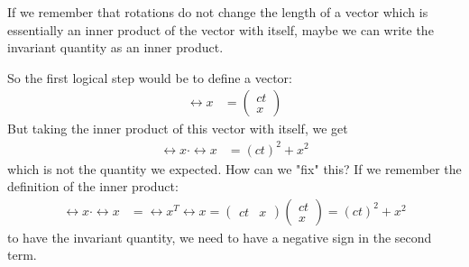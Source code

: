 If we remember that rotations do not change the length of a vector which is essentially an inner product of the vector with itself,
maybe we can write the invariant quantity as an inner product.

So the first logical step would be to define a vector:
\begin{align}
  \rel{x} & = \begin{pmatrix}
                ct \\
                x
              \end{pmatrix}
\end{align}
But taking the inner product of this vector with itself, we get
\begin{align}
  \rel{x} \cdot \rel{x} & = (ct)^2 + x^2
\end{align}
which is not the quantity we expected.
How can we "fix" this?
If we remember the definition of the inner product:
\begin{align}
  \rel{x} \cdot \rel{x} & = \rel{x}^T \rel{x} = \begin{pmatrix}
                                                  ct & x
                                                \end{pmatrix}
  \begin{pmatrix}
    ct \\
    x
  \end{pmatrix} = (ct)^2 + x^2
\end{align}
to have the invariant quantity, we need to have a negative sign in the second term.

